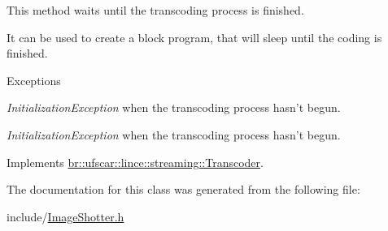 This method waits until the transcoding process is finished. 

It can be used to create a block program, that will sleep until the coding is finished. 
\begin{DoxyExceptions}{Exceptions}
\item[{\em InitializationException}]when the transcoding process hasn't begun. \item[{\em InitializationException}]when the transcoding process hasn't begun. \end{DoxyExceptions}


Implements \hyperlink{classbr_1_1ufscar_1_1lince_1_1streaming_1_1Transcoder_abec1e8b2d9e04e79bf878206a70df2d9}{br::ufscar::lince::streaming::Transcoder}.



The documentation for this class was generated from the following file:\begin{DoxyCompactItemize}
\item 
include/\hyperlink{ImageShotter_8h}{ImageShotter.h}\end{DoxyCompactItemize}

